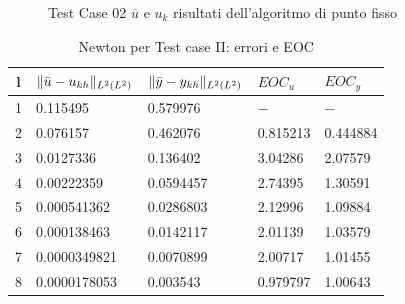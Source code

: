\begin{figure}
\qquad
{}
\caption{Test Case 02 $\overline{u}$ e $u_k$ risultati dell'algoritmo di punto fisso}
\label{fig:504}
\end{figure}

\begin{table}
\caption{Newton per Test case II: errori e EOC }
\label{newtonII}
\centering

\begin{tabular}{cllll}
\toprule
{l} &  {$ \lVert\bar{u}-u_{kh}\rVert_{L^2(L^2)} $} &  {$ \lVert\bar{y}-y_{kh}\rVert_{L^2(L^2)} $} &  {$ EOC_{u} $} &  {$ EOC_y $} \\
\midrule
1            &  0.115495 &  0.579976 &  {$-$} &  {$-$} \\
2            &  0.076157  &  0.462076 &  0.815213 &  0.444884 \\
3            &  0.0127336  &  0.136402 &  3.04286 &  2.07579 \\
4            &  0.00222359 &  0.0594457 &  2.74395 &  1.30591 \\
5            &  0.000541362 &  0.0286803 &  2.12996 &  1.09884 \\
6            &  0.000138463  &  0.0142117 &  2.01139 &  1.03579 \\
7            &  0.0000349821 &  0.0070899 &  2.00717 &  1.01455 \\      
8            &  0.0000178053 &  0.003543 &  0.979797  &  1.00643 \\
\bottomrule
\end{tabular}              

\end{table}





